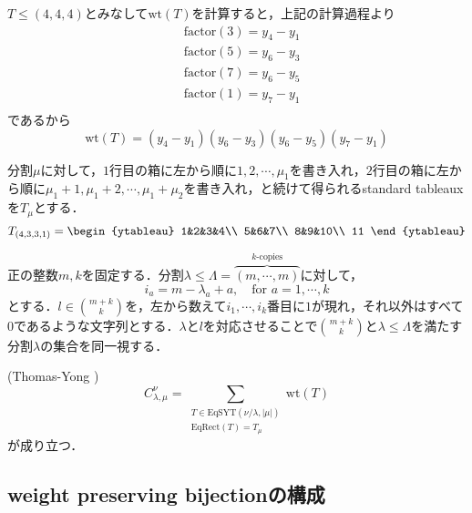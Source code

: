 \begin{eg}
\begin{center}
  \end{center}
  $T\leq (4,4,4)$とみなして$\text{wt}(T)$を計算すると，上記の計算過程より
\begin{align*}
  &\text{factor}(3)=y_4-y_1\\
  &\text{factor}(5)=y_6-y_3\\
  &\text{factor}(7)=y_6-y_5\\
  &\text{factor}(1)=y_7-y_1\\
\end{align*}
  であるから
  \[
  \text{wt}(T)=(y_4-y_1)(y_6-y_3)(y_6-y_5)(y_7-y_1)
  \]
\end{eg}


分割$\mu$に対して，$1$行目の箱に左から順に$1,2,\cdots,\mu_1$を書き入れ，$2$行目の箱に左から順に$\mu_1+1,\mu_1+2,\cdots,\mu_1+\mu_2$を書き入れ，と続けて得られるstandard tableauxを$T_\mu$とする．
\[
T_{(4,3,3,1)}=
\begin{ytableau}
  1&2&3&4\\
  5&6&7\\
  8&9&10\\
  11
\end{ytableau}
\]

正の整数$m,k$を固定する．分割$\lambda\leq\Lambda=\overbrace{(m,\cdots,m)}^{k\text{-copies}}$に対して，
\[
i_a=m-\lambda_a+a,\quad \text{for }a=1,\cdots,k
\]
とする．$l\in\binom{m+k}{k}$を，左から数えて$i_1,\cdots,i_k$番目に$1$が現れ，それ以外はすべて$0$であるような文字列とする．$\lambda$と$l$を対応させることで$\binom{m+k}{k}$と$\lambda\leq\Lambda$を満たす分割$\lambda$の集合を同一視する．

\begin{theo}(Thomas-Yong \cite{thomas yong})
  \[
  C^{\nu}_{\lambda,\mu}=\sum_{\substack{T\in\text{EqSYT}(\nu/\lambda, |\mu|) \\ \text{EqRect}(T)=T_\mu}}\text{wt}(T)
  \]
  が成り立つ．
\end{theo}




\subsection{weight preserving bijectionの構成}